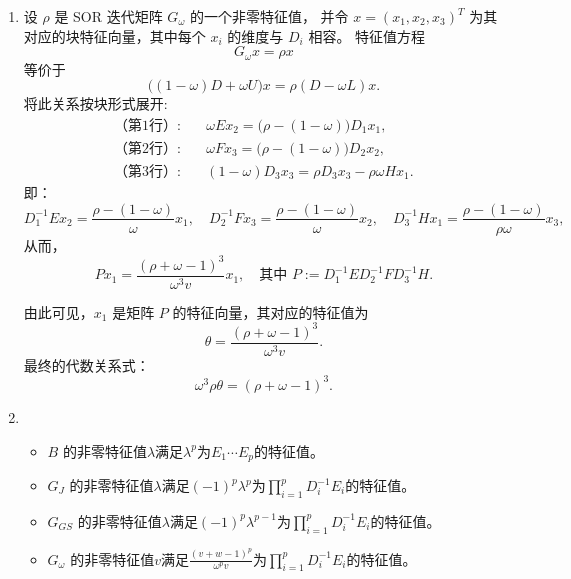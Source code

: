 \documentclass{ctexart}
\begin{document}
\begin{solution}
\begin{enumerate}
\item 设 $\rho$ 是 SOR 迭代矩阵 $G_\omega$ 的一个非零特征值，  
并令 $x = (x_1, x_2, x_3)^T$ 为其对应的块特征向量，其中每个 $x_i$ 的维度与 $D_i$ 相容。  
特征值方程
\[
G_\omega x = \rho x
\]
等价于
\[
\bigl((1-\omega) D + \omega U \bigr) x = \rho (D - \omega L) x.
\]
将此关系按块形式展开:
\begin{align*}
  \text{（第1行）:} &\quad 
  \omega E x_2 = \bigl(\rho - (1-\omega)\bigr) D_1 x_1, \\
  \text{（第2行）:} &\quad 
  \omega F x_3 = \bigl(\rho - (1-\omega)\bigr) D_2 x_2, \\
  \text{（第3行）:} &\quad 
  (1-\omega) D_3 x_3 = \rho D_3 x_3 - \rho \omega H x_1.
\end{align*}
即：
\[
D_1^{-1} E x_2 = \frac{\rho - (1-\omega)}{\omega}  x_1, 
\quad
D_2^{-1} F x_3 = \frac{\rho - (1-\omega)}{\omega}  x_2,
\quad
D_3^{-1} H x_1 = \frac{\rho - (1-\omega) }{\rho \omega}x_3,
\]
从而，
\[
P x_1 = \frac{(\rho  + \omega -1)^3}{\omega^3v} x_1,
\quad \text{其中 } 
P := D_1^{-1} E D_2^{-1} F D_3^{-1} H.
\]

由此可见，$x_1$ 是矩阵 $P$ 的特征向量，其对应的特征值为
\[
  \theta = \frac{(\rho  + \omega -1 )^3}{\omega^3v}.
\]
最终的代数关系式：
\[
\omega^3\rho\theta = (\rho + \omega - 1)^3.
\]
\item 
  \begin{itemize}
    \item \(B \) 的非零特征值\(\lambda \)满足\(\lambda^p \)为\(E_1\cdots E_p \)的特征值。
    \item \(G_J \) 的非零特征值\(\lambda \)满足\((-1)^p \lambda^p \)为\(\prod_{i=1}^{p}D_i^{-1}E_i \)的特征值。
    \item \(G_{GS} \) 的非零特征值\(\lambda \)满足\((-1)^p \lambda^{p-1} \)为\(\prod_{i=1}^{p}D_i^{-1}E_i \)的特征值。
    \item \(G_{\omega} \) 的非零特征值\(v \)满足\(\frac{(v + w -1)^p}{\omega^pv }\)为\(\prod_{i=1}^{p}D_i^{-1}E_i \)的特征值。
  \end{itemize}
  
\end{enumerate}
\end{solution}
\end{document}
